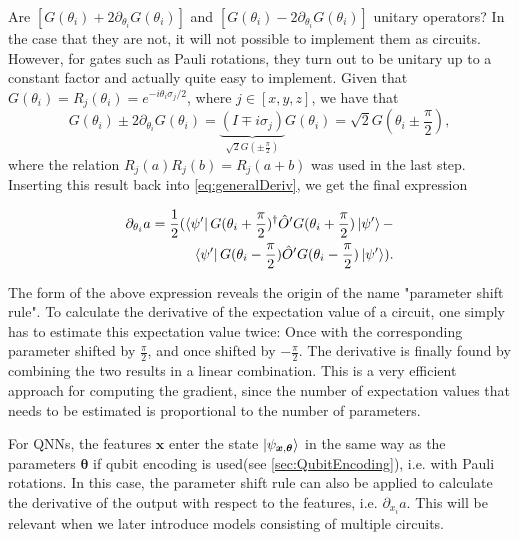 Are $[G(\theta_i)+2\partial_{\theta_i}G(\theta_i)]$ and $[G(\theta_i)-2\partial_{\theta_i}G(\theta_i)]$ unitary operators? In the case that they are not, it will not possible to implement them as circuits. However, for gates such as Pauli rotations, they turn out to be unitary up to a constant factor and actually quite easy to implement. Given that $G(\theta_i) = R_j(\theta_i) = e^{-i\theta_i \sigma_j/2}$, where $j \in [x,y,z]$, we have that 
\begin{equation}
    G(\theta_i)\pm2\partial_{\theta_i}G(\theta_i) = 
    \underset{\sqrt{2}G(\pm \frac{\pi}{2})}{\underbrace{(I \mp i\sigma_j)}}G(\theta_i) = 
    \sqrt{2}G(\theta_i \pm \frac{\pi}{2}),
\end{equation}
where the relation $R_j(a)R_j(b) = R_j(a+b)$ was used in the last step. Inserting this result back into \autoref{eq:generalDeriv}, we get the final expression 


\begin{equation}\label{eq:parameterShiftRule}
\begin{aligned}
    \partial_{\theta_i} a = 
    \frac{1}{2}(
    \bra{\psi'} G(\theta_i + \frac{\pi}{2})^{\dagger} \hat{O}' G(\theta_i + \frac{\pi}{2}) \ket{\psi'} -\\
    \bra{\psi'} G(\theta_i - \frac{\pi}{2}) \hat{O}' G(\theta_i - \frac{\pi}{2}) \ket{\psi'}).
\end{aligned}
\end{equation}

The form of the above expression reveals the origin of the name "parameter shift rule". To calculate the derivative of the expectation value of a circuit, one simply has to estimate this expectation value twice: Once with the corresponding parameter shifted by $\frac{\pi}{2}$, and once shifted by $-\frac{\pi}{2}$. The derivative is finally found by combining the two results in a linear combination. This is a very efficient approach for computing the gradient, since the number of expectation values that needs to be estimated is proportional to the number of parameters.

For QNNs, the features $\boldsymbol{x}$ enter the state $\ket{\psi_{\boldsymbol{x},\boldsymbol{\theta}}}$ in the same way as the parameters $\boldsymbol{\theta}$ if qubit encoding is used(see \autoref{sec:QubitEncoding}), i.e. with Pauli rotations. In this case, the parameter shift rule can also be applied to calculate the derivative of the output with respect to the features, i.e. $\partial_{x_i}a$. This will be relevant when we later introduce models consisting of multiple circuits. 

